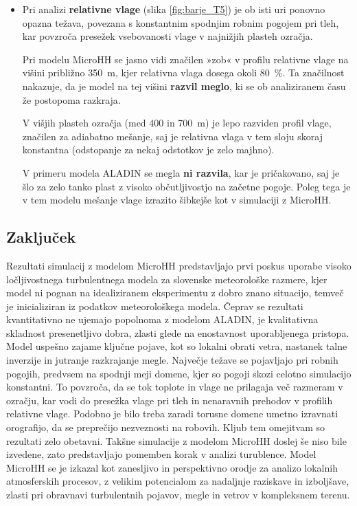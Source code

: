 \documentclass[mat2, tisk]{fmfdelo}
\begin{document}
\begin{itemize}
\item Pri analizi \textbf{relativne vlage} (slika \ref{fig:barje_T5}) je ob isti uri ponovno opazna težava, povezana s 
{konstantnim spodnjim robnim pogojem} pri tleh, kar povzroča 
{presežek vsebovanosti vlage v najnižjih plasteh ozračja}. 

Pri modelu {MicroHH} se jasno vidi značilen 
{»zob« v profilu relativne vlage} na višini približno {350~m}, 
kjer relativna vlaga dosega okoli {80~\%}. 
Ta značilnost nakazuje, da je model na tej višini \textbf{razvil meglo}, 
ki se ob analiziranem času že {postopoma razkraja}. 

V višjih plasteh ozračja (med {400 in 700~m}) je lepo razviden 
{profil vlage}, značilen za {adiabatno mešanje}, 
saj je {relativna vlaga v tem sloju skoraj konstantna} (odstopanje za nekaj odstotkov je zelo majhno). 

V primeru modela {ALADIN} 
se megla \textbf{ni razvila}, kar je pričakovano, saj je šlo za {zelo tanko plast} 
z visoko občutljivostjo na začetne pogoje. 
Poleg tega je v tem modelu {mešanje vlage izrazito šibkejše} kot v simulaciji z MicroHH. 
\end{itemize}
\newpage
\subsection{Zaključek}
Rezultati simulacij z modelom MicroHH predstavljajo prvi poskus
uporabe visoko ločljivostnega turbulentnega modela za slovenske 
meteorološke razmere, kjer model ni pognan na idealiziranem 
eksperimentu z dobro znano situacijo, temveč je inicializiran 
iz podatkov meteorološkega modela. Čeprav se rezultati 
kvantitativno 
ne ujemajo popolnoma z modelom ALADIN, je kvalitativna 
skladnost presenetljivo dobra, zlasti glede na enostavnost 
uporabljenega pristopa. Model uspešno zajame ključne pojave, 
kot so lokalni obrati vetra, nastanek talne inverzije in 
jutranje razkrajanje megle.
Največje težave se pojavljajo pri robnih pogojih, predvsem na 
spodnji meji domene, kjer so pogoji skozi celotno simulacijo 
konstantni. To povzroča, da se tok toplote in vlage ne 
prilagaja več razmeram v ozračju, kar vodi do presežka vlage 
pri tleh in nenaravnih prehodov v profilih relativne vlage. 
Podobno je bilo treba zaradi torusne domene umetno izravnati 
orografijo, da se preprečijo nezveznosti na robovih.
Kljub tem omejitvam so rezultati zelo obetavni. Takšne 
simulacije z modelom MicroHH doslej še niso bile izvedene, zato
predstavljajo pomemben korak v analizi turublence. Model MicroHH se je 
izkazal kot zanesljivo in perspektivno orodje za analizo 
lokalnih atmosferskih procesov, z velikim potencialom za 
nadaljnje raziskave in izboljšave, zlasti pri obravnavi 
turbulentnih pojavov, megle in vetrov v kompleksnem terenu.
\end{document}

